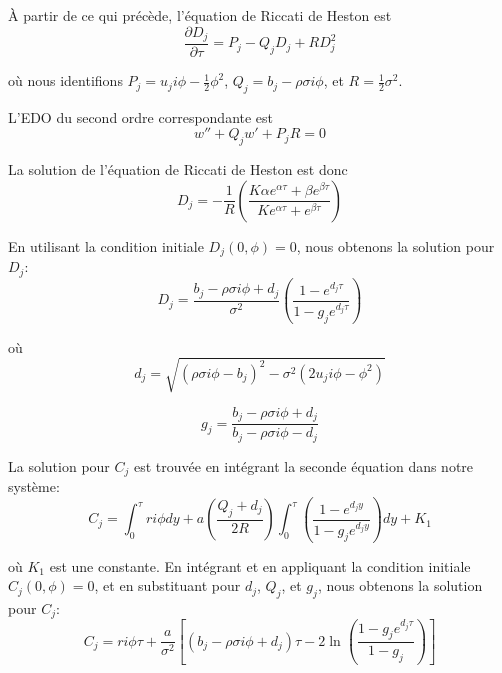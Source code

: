 À partir de ce qui précède, l'équation de Riccati de Heston est
\begin{equation}
\frac{\partial D_j}{\partial \tau} = P_j - Q_j D_j + R D_j^2
\end{equation}

où nous identifions $P_j = u_j i\phi - \frac{1}{2}\phi^2$, $Q_j = b_j - \rho\sigma i\phi$, et $R = \frac{1}{2}\sigma^2$.

L'EDO du second ordre correspondante est
\begin{equation}
w'' + Q_j w' + P_j R = 0
\end{equation}

La solution de l'équation de Riccati de Heston est donc
\begin{equation}
D_j = -\frac{1}{R}\left(\frac{K\alpha e^{\alpha\tau} + \beta e^{\beta\tau}}{Ke^{\alpha\tau} + e^{\beta\tau}}\right)
\end{equation}

En utilisant la condition initiale $D_j(0, \phi) = 0$, nous obtenons la solution pour $D_j$:
\begin{equation}
D_j = \frac{b_j - \rho\sigma i\phi + d_j}{\sigma^2}\left(\frac{1 - e^{d_j\tau}}{1 - g_j e^{d_j\tau}}\right)
\end{equation}

où
\begin{equation}
d_j = \sqrt{(\rho\sigma i\phi - b_j)^2 - \sigma^2(2u_j i\phi - \phi^2)}
\end{equation}

\begin{equation}
g_j = \frac{b_j - \rho\sigma i\phi + d_j}{b_j - \rho\sigma i\phi - d_j}
\end{equation}

La solution pour $C_j$ est trouvée en intégrant la seconde équation dans notre système:
\begin{equation}
C_j = \int_0^{\tau} ri\phi dy + a\left(\frac{Q_j + d_j}{2R}\right)\int_0^{\tau}\left(\frac{1 - e^{d_j y}}{1 - g_j e^{d_j y}}\right)dy + K_1
\end{equation}

où $K_1$ est une constante. En intégrant et en appliquant la condition initiale $C_j(0, \phi) = 0$, et en substituant pour $d_j$, $Q_j$, et $g_j$, nous obtenons la solution pour $C_j$:
\begin{equation}
C_j = ri\phi\tau + \frac{a}{\sigma^2}\left[(b_j - \rho\sigma i\phi + d_j)\tau - 2\ln\left(\frac{1 - g_j e^{d_j\tau}}{1 - g_j}\right)\right]
\end{equation}

